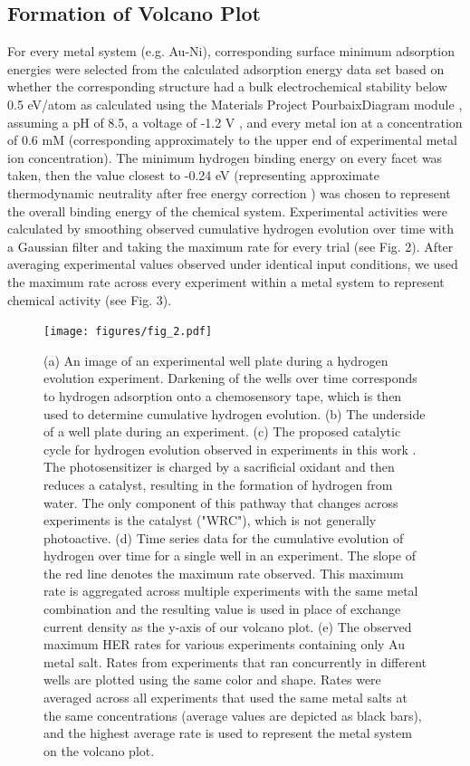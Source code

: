 \documentclass[preprint,12pt]{elsarticle}
\begin{document}
\subsection{Formation of Volcano Plot}\label{Section:Experimental/Volcano}
For every metal system (e.g. Au-Ni), corresponding surface minimum adsorption energies were selected from the calculated adsorption energy data set based on whether the corresponding structure had a bulk electrochemical stability below 0.5 eV/atom as calculated using the Materials Project PourbaixDiagram module \cite{singh2017electrochemical,persson2012prediction,patel2019efficient}, assuming a pH of 8.5, a voltage of -1.2 V \cite{lowry2005single}, and every metal ion at a concentration of 0.6 mM (corresponding approximately to the upper end of experimental metal ion concentration). The minimum hydrogen binding energy on every facet was taken, then the value closest to -0.24 eV (representing approximate thermodynamic neutrality after free energy correction \cite{norskov2005trends}) was chosen to represent the overall binding energy of the chemical system. Experimental activities were calculated by smoothing observed cumulative hydrogen evolution over time with a Gaussian filter and taking the maximum rate for every trial (see Fig. 2). After averaging experimental values observed under identical input conditions, we used the maximum rate across every experiment within a metal system to represent chemical activity (see Fig. 3). 

\begin{figure}[h]
\centering
    \texttt{[image: figures/fig\_2.pdf]}
\caption{(a) An image of an experimental well plate during a hydrogen evolution experiment. Darkening of the wells over time corresponds to hydrogen adsorption onto a chemosensory tape, which is then used to determine cumulative hydrogen evolution. (b) The underside of a well plate during an experiment. (c) The proposed catalytic cycle for hydrogen evolution observed in experiments in this work \cite{lopato2020parallelized}. The photosensitizer is charged by a sacrificial oxidant and then reduces a catalyst, resulting in the formation of hydrogen from water. The only component of this pathway that changes across experiments is the catalyst ("WRC"), which is not generally photoactive. (d) Time series data for the cumulative evolution of hydrogen over time for a single well in an experiment. The slope of the red line denotes the maximum rate observed. This maximum rate is aggregated across multiple experiments with the same metal combination and the resulting value is used in place of exchange current density as the y-axis of our volcano plot. (e) The observed maximum HER rates for various experiments containing only Au metal salt. Rates from experiments that ran concurrently in different wells are plotted using the same color and shape. Rates were averaged across all experiments that used the same metal salts at the same concentrations (average values are depicted as black bars), and the highest average rate is used to represent the metal system on the volcano plot.
}
\end{figure}
\end{document}
